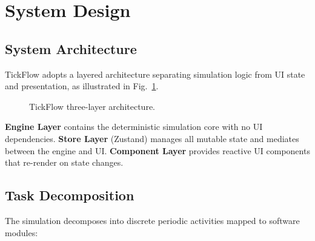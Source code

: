 \documentclass[conference]{IEEEtran}
\begin{document}
\section{System Design}

\subsection{System Architecture}
TickFlow adopts a layered architecture separating simulation logic from UI state and presentation, as illustrated in Fig.~\ref{fig:arch}.

\begin{figure}[h]
  \centering
  \caption{TickFlow three-layer architecture.}
  \label{fig:arch}
\end{figure}

\textbf{Engine Layer} contains the deterministic simulation core with no UI dependencies. \textbf{Store Layer} (Zustand) manages all mutable state and mediates between the engine and UI. \textbf{Component Layer} provides reactive UI components that re-render on state changes.

\subsection{Task Decomposition}
The simulation decomposes into discrete periodic activities mapped to software modules:
\end{document}
